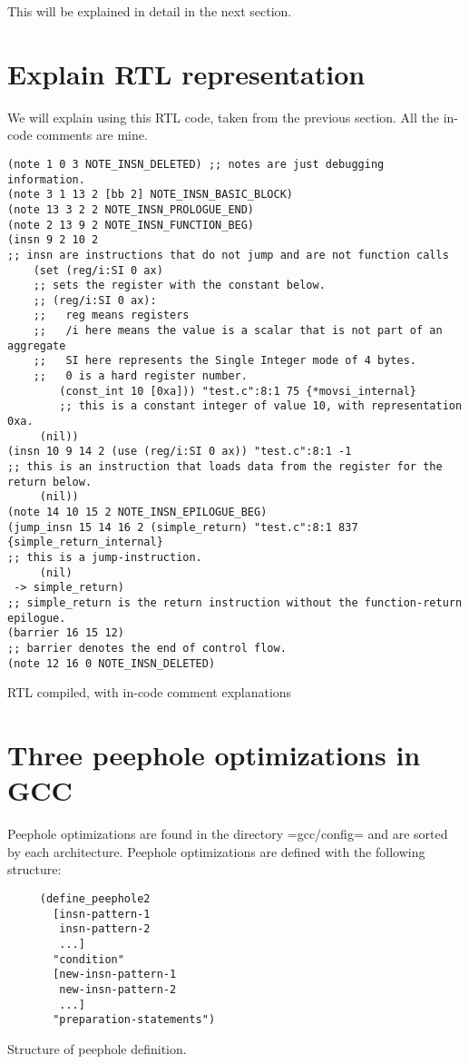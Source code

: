 \documentclass[11pt]{article}
\begin{document}
This will be explained in detail in the next section.
\section{Explain RTL representation}
\label{sec:orga6f1ca1}
We will explain using this RTL code, taken from the previous section. All the
in-code comments are mine.

\begin{listing}[H]
\begin{verbatim}
(note 1 0 3 NOTE_INSN_DELETED) ;; notes are just debugging information.
(note 3 1 13 2 [bb 2] NOTE_INSN_BASIC_BLOCK)
(note 13 3 2 2 NOTE_INSN_PROLOGUE_END)
(note 2 13 9 2 NOTE_INSN_FUNCTION_BEG)
(insn 9 2 10 2
;; insn are instructions that do not jump and are not function calls
    (set (reg/i:SI 0 ax)
    ;; sets the register with the constant below.
    ;; (reg/i:SI 0 ax):
    ;;   reg means registers
    ;;   /i here means the value is a scalar that is not part of an aggregate
    ;;   SI here represents the Single Integer mode of 4 bytes.
    ;;   0 is a hard register number.
        (const_int 10 [0xa])) "test.c":8:1 75 {*movsi_internal}
        ;; this is a constant integer of value 10, with representation 0xa.
     (nil))
(insn 10 9 14 2 (use (reg/i:SI 0 ax)) "test.c":8:1 -1
;; this is an instruction that loads data from the register for the return below.
     (nil))
(note 14 10 15 2 NOTE_INSN_EPILOGUE_BEG)
(jump_insn 15 14 16 2 (simple_return) "test.c":8:1 837 {simple_return_internal}
;; this is a jump-instruction.
     (nil)
 -> simple_return)
;; simple_return is the return instruction without the function-return epilogue.
(barrier 16 15 12)
;; barrier denotes the end of control flow.
(note 12 16 0 NOTE_INSN_DELETED)
\end{verbatim}
\caption{RTL compiled, with in-code comment explanations}
\end{listing}

\section{Three peephole optimizations in GCC}
Peephole optimizations are found in the directory =gcc/config= and are sorted by
each architecture. Peephole optimizations are defined with the following
structure:

\begin{listing}[H]
\begin{verbatim}
     (define_peephole2
       [insn-pattern-1
        insn-pattern-2
        ...]
       "condition"
       [new-insn-pattern-1
        new-insn-pattern-2
        ...]
       "preparation-statements")
\end{verbatim}
\caption{Structure of peephole definition.}
\end{listing}
\end{document}
